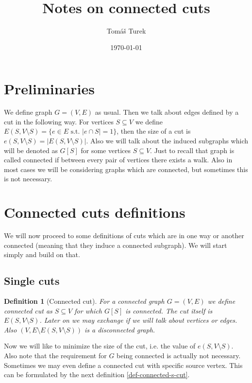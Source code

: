 \documentclass{article}
\title{Notes on connected cuts}
\author{Tomáš Turek}
\date{\today}
\theoremstyle{plain}
\theoremstyle{plain}
\newtheorem{defn}{Definition}
\theoremstyle{remark}
\begin{document}
	\maketitle
	
	\tableofcontents
	
	\section{Preliminaries}
	
	We define graph $G = (V,E)$ as usual. Then we talk about edges defined by a cut in the following way. For vertices $S \subseteq V$ we define $E(S, V \setminus S) = \{e \in E \text{ s.t. } |e \cap S| = 1\}$, then the size of a cut is $e(S, V \setminus S) = |E(S, V \setminus S)|$. Also we will talk about the induced subgraphs which will be denoted as $G[S]$ for some vertices $S \subseteq V$. Just to recall that graph is called connected if between every pair of vertices there exists a walk. Also in most cases we will be considering graphs which are connected, but sometimes this is not necessary.
	
	
	\section{Connected cuts definitions}
	
	We will now proceed to some definitions of cuts which are in one way or another connected (meaning that they induce a connected subgraph). We will start simply and build on that.
	
	\subsection{Single cuts}
	
	\begin{defn}[Connected cut]
		For a connected graph $G = (V,E)$ we define connected cut as $S \subseteq V$ for which $G[S]$ is connected. The cut itself is $E(S, V \setminus S)$. Later on we may exchange if we will talk about vertices or edges. Also $(V, E \setminus E(S, V \setminus S))$ is a disconnected graph.
		\label{def-connected-cut}
	\end{defn}
	
	Now we will like to minimize the size of the cut, i.e. the value of $e(S, V \setminus S)$. Also note that the requirement for $G$ being connected is actually not necessary. Sometimes we may even define a connected cut with specific source vertex. This can be formulated by the next definition \ref{def-connected-s-cut}.
	
\end{document}

